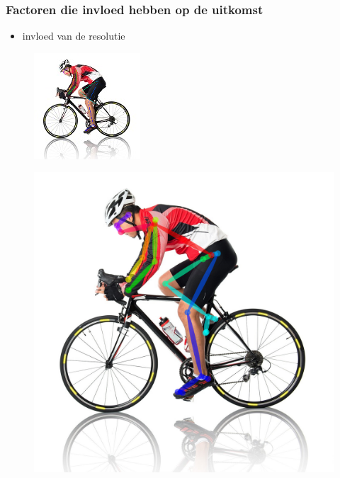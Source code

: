 \documentclass
   [kulak] %
   {kulakbeamer}
\begin{document}
\begin{frame}
	\frametitle{Factoren die invloed hebben op de uitkomst}
	\begin{itemize}
		\item invloed van de resolutie
	\end{itemize}
	\begin{figure}
		\begin{minipage}[b]{.5\linewidth}
			\centering\includegraphics[width= \textwidth]{150x150}
			\label{fig:1a}
		\end{minipage}%
		\begin{minipage}[b]{.5\linewidth}
			\centering\includegraphics[width= \textwidth]{1500x1500}
			\label{fig:1b}
		\end{minipage}
	\end{figure}
\end{frame}
\end{document}
